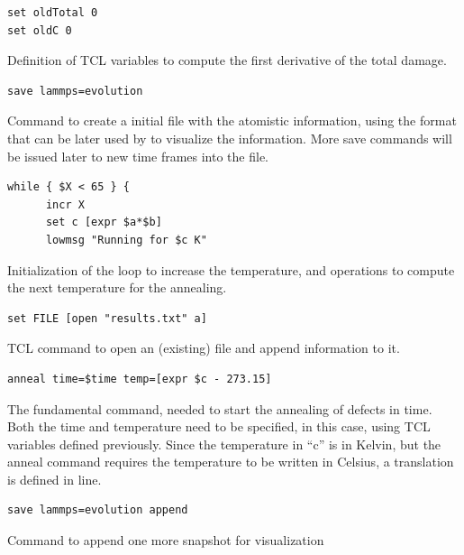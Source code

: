 \begin{lstlisting}[firstnumber=24]
set oldTotal 0
set oldC 0
\end{lstlisting}
Definition of TCL variables to compute the first derivative of the total damage.

\begin{lstlisting}[firstnumber=27]
save lammps=evolution
\end{lstlisting}
Command to create a initial file with the atomistic information, using the  format that can be later used by  to visualize the information. More save commands will be issued later to  new time frames into the file.

\begin{lstlisting}[firstnumber=28]
while { $X < 65 } {
      incr X
      set c [expr $a*$b]
      lowmsg "Running for $c K"      
\end{lstlisting}
Initialization of the loop to increase the temperature, and operations to compute the next temperature for the annealing.

\begin{lstlisting}[firstnumber=32]
      set FILE [open "results.txt" a]
\end{lstlisting}
TCL command to open an (existing) file and append information to it.

\begin{lstlisting}[firstnumber=33]
      anneal time=$time temp=[expr $c - 273.15]
\end{lstlisting}
The fundamental  command, needed to start the annealing of defects in time. Both the time and temperature need to be specified, in this case, using TCL variables defined previously. Since the temperature in ``c'' is in Kelvin, but the anneal command requires the temperature to be written in Celsius, a translation is defined in line.

\begin{lstlisting}[firstnumber=34]
      save lammps=evolution append
\end{lstlisting}
Command to append one more snapshot for visualization

